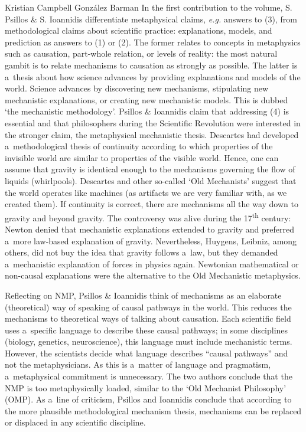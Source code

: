 \begin{recengenv}{Kristian Campbell González Barman}
\enlargethispage{1.5\baselineskip}
In the first contribution to the volume, S. Psillos \& S. Ioannidis differentiate metaphysical claims, \textit{e.g.} answers to (3), from methodological claims about scientific practice: explanations, models, and prediction as answers to (1) or (2). The former relates to concepts in metaphysics such as causation, part-whole relation, or levels of reality: the most natural gambit is to relate mechanisms to causation as strongly as possible. The latter is a~thesis about how science advances by providing explanations and models of the world. Science advances by discovering new mechanisms, stipulating new mechanistic explanations, or creating new mechanistic models. This is dubbed ‘the mechanistic methodology'. Psillos \& Ioannidis claim that addressing (4) is essential and that philosophers during the Scientific Revolution were interested in the stronger claim, the metaphysical mechanistic thesis. Descartes had developed a~methodological thesis of continuity according to which properties of the invisible world are similar to properties of the visible world. Hence, one can assume that gravity is identical enough to the mechanisms governing the flow of liquids (whirlpools). Descartes and other so-called ‘Old Mechanists' suggest that the world operates like machines (as artifacts we are very familiar with, as we created them). If continuity is correct, there are mechanisms all the way down to gravity and beyond gravity. The controversy was alive during the 17\textsuperscript{th} century: Newton denied that mechanistic explanations extended to gravity and preferred a~more law-based explanation of gravity. Nevertheless, Huygens, Leibniz, among others, did not buy the idea that gravity follows a~law, but they demanded a~mechanistic explanation of forces in physics again. Newtonian mathematical or non-causal explanations were the alternative to the Old Mechanistic metaphysics.

Reflecting on NMP, Psillos \& Ioannidis think of mechanisms as an elaborate (theoretical) way of speaking of causal pathways in the world. This reduces the mechanisms to theoretical ways of talking about causation. Each scientific field uses a~specific language to describe these causal pathways; in some disciplines (biology, genetics, neuroscience), this language must include mechanistic terms. However, the scientists decide what language describes ``causal pathways'' and not the metaphysicians. As this is a~matter of language and pragmatism, a~metaphysical commitment is unnecessary. The two authors conclude that the NMP is too metaphysically loaded, similar to the ‘Old Mechanist Philosophy' (OMP). As a~line of criticism, Psillos and Ioannidis conclude that according to the more plausible methodological mechanism thesis, mechanisms can be replaced or displaced in any scientific discipline.


\end{recengenv}
